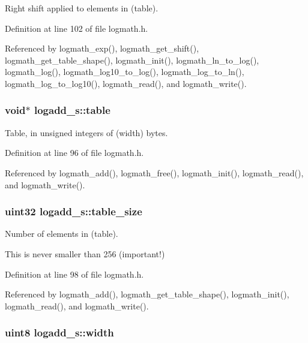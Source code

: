 Right shift applied to elements in (table). 



Definition at line 102 of file logmath.\-h.



Referenced by logmath\-\_\-exp(), logmath\-\_\-get\-\_\-shift(), logmath\-\_\-get\-\_\-table\-\_\-shape(), logmath\-\_\-init(), logmath\-\_\-ln\-\_\-to\-\_\-log(), logmath\-\_\-log(), logmath\-\_\-log10\-\_\-to\-\_\-log(), logmath\-\_\-log\-\_\-to\-\_\-ln(), logmath\-\_\-log\-\_\-to\-\_\-log10(), logmath\-\_\-read(), and logmath\-\_\-write().

\subsubsection[{table}]{\setlength{\rightskip}{0pt plus 5cm}void$\ast$ logadd\-\_\-s\-::table}\label{structlogadd__s_a27793577d513d85cd73c2daffc140695}


Table, in unsigned integers of (width) bytes. 



Definition at line 96 of file logmath.\-h.



Referenced by logmath\-\_\-add(), logmath\-\_\-free(), logmath\-\_\-init(), logmath\-\_\-read(), and logmath\-\_\-write().

\subsubsection[{table\-\_\-size}]{\setlength{\rightskip}{0pt plus 5cm}uint32 logadd\-\_\-s\-::table\-\_\-size}\label{structlogadd__s_a484c53a05b46d863d0456af679cee5d8}


Number of elements in (table). 

This is never smaller than 256 (important!) 

Definition at line 98 of file logmath.\-h.



Referenced by logmath\-\_\-add(), logmath\-\_\-get\-\_\-table\-\_\-shape(), logmath\-\_\-init(), logmath\-\_\-read(), and logmath\-\_\-write().

\subsubsection[{width}]{\setlength{\rightskip}{0pt plus 5cm}uint8 logadd\-\_\-s\-::width}\label{structlogadd__s_a8e35a353d751d957270baf5192007c3e}


